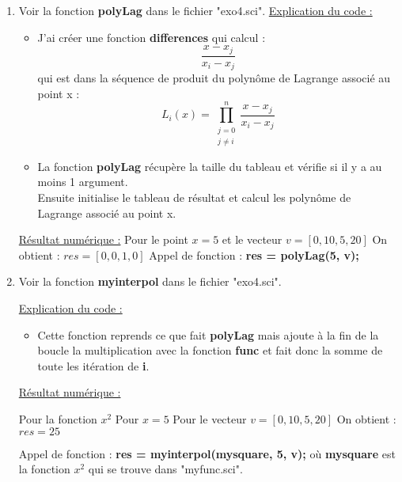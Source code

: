 \documentclass[12pt, letterpaper]{article}
\begin{document}
\begin{enumerate}
\item Voir la fonction \textbf{polyLag} dans le fichier "exo4.sci".\newline
  \underline{Explication du code :}
  \begin{itemize}
  \item J'ai créer une fonction \textbf{differences} qui calcul :
  \begin{equation*}
    \frac{x - x_j}{x_i - x_j}
  \end{equation*}
  qui est dans la séquence de produit du polynôme de Lagrange associé
  au point x :
  \begin{equation*}
    L_i(x) = \prod_{\begin{array}{l} j = 0 \\ j \ne i \end{array}}^{n}\frac{x - x_j}{x_i - x_j}
  \end{equation*}

  \item La fonction \textbf{polyLag} récupère la taille du tableau et
  vérifie si il y a au moins 1 argument.\\
  Ensuite initialise le tableau de résultat et calcul les polynôme de
  Lagrange associé au point x.
  \end{itemize}
  
  \underline{Résultat numérique :}\newline
  Pour le point $x = 5$ et le vecteur $v = [0, 10, 5, 20]$ \newline
  On obtient : $res = [0, 0, 1, 0]$ \newline
  Appel de fonction : \textbf{res = polyLag(5, v);} \newline
  
\item Voir la fonction \textbf{myinterpol} dans le fichier
  "exo4.sci".\newline
  
  \underline{Explication du code :}
  \begin{itemize}
    \item Cette fonction reprends ce que fait \textbf{polyLag} mais
      ajoute à la fin de la boucle la multiplication avec la fonction
      \textbf{func} et fait donc la somme de toute les itération de
      \textbf{i}.
  \end{itemize}
  
  \underline{Résultat numérique :}

  Pour la fonction $x^2$ \newline
  Pour $x = 5$ \newline
  Pour le vecteur $v = [0, 10, 5, 20]$ \newline
  On obtient : $res = 25$ \newline

  Appel de fonction : \textbf{res = myinterpol(mysquare, 5, v);} \newline
  où \textbf{mysquare} est la fonction $x^2$ qui se trouve dans "myfunc.sci".
  
\end{enumerate}
\end{document}
